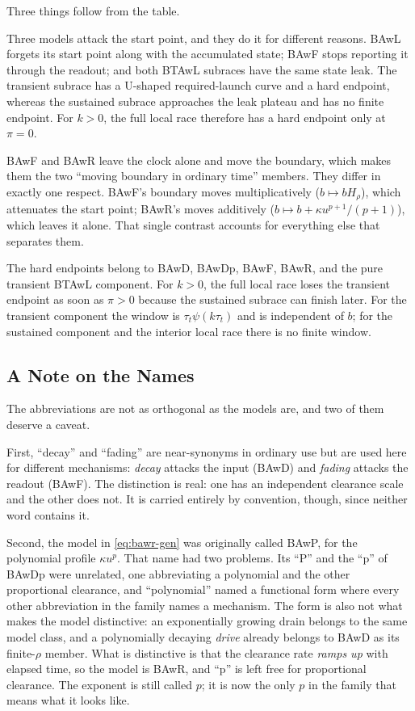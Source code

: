 \documentclass[12pt]{article}
\theoremstyle{remark}
\begin{document}
Three things follow from the table.

Three models attack the start point, and they do it for different reasons. BAwL forgets its start point along with the accumulated state; BAwF stops reporting it through the readout; and both BTAwL subraces have the same state leak.  The transient subrace has a U-shaped required-launch curve and a hard endpoint, whereas the sustained subrace approaches the leak plateau and has no finite endpoint.  For $k>0$, the full local race therefore has a hard endpoint only at $\pi=0$.

BAwF and BAwR leave the clock alone and move the boundary, which makes them the two ``moving boundary in ordinary time'' members. They differ in exactly one respect. BAwF's boundary moves multiplicatively ($b\mapsto bH_\rho$), which attenuates the start point; BAwR's moves additively ($b\mapsto b+\kappa u^{p+1}/(p+1)$), which leaves it alone. That single contrast accounts for everything else that separates them.

The hard endpoints belong to BAwD, BAwDp, BAwF, BAwR, and the pure transient BTAwL component.  For $k>0$, the full local race loses the transient endpoint as soon as $\pi>0$ because the sustained subrace can finish later.  For the transient component the window is $\tau_t\psi(k\tau_t)$ and is independent of $b$; for the sustained component and the interior local race there is no finite window.

\subsection{A Note on the Names}
\label{sec:names}
The abbreviations are not as orthogonal as the models are, and two of them deserve a caveat.

First, ``decay'' and ``fading'' are near-synonyms in ordinary use but are used here for different mechanisms: \emph{decay} attacks the input (BAwD) and \emph{fading} attacks the readout (BAwF). The distinction is real: one has an independent clearance scale and the other does not. It is carried entirely by convention, though, since neither word contains it.

Second, the model in \eqref{eq:bawr-gen} was originally called BAwP, for the polynomial profile $\kappa u^{p}$. That name had two problems. Its ``P'' and the ``p'' of BAwDp were unrelated, one abbreviating a polynomial and the other proportional clearance, and ``polynomial'' named a functional form where every other abbreviation in the family names a mechanism. The form is also not what makes the model distinctive: an exponentially growing drain belongs to the same model class, and a polynomially decaying \emph{drive} already belongs to BAwD as its finite-$\rho$ member. What is distinctive is that the clearance rate \emph{ramps up} with elapsed time, so the model is BAwR, and ``p'' is left free for proportional clearance. The exponent is still called $p$; it is now the only $p$ in the family that means what it looks like.
\end{document}
